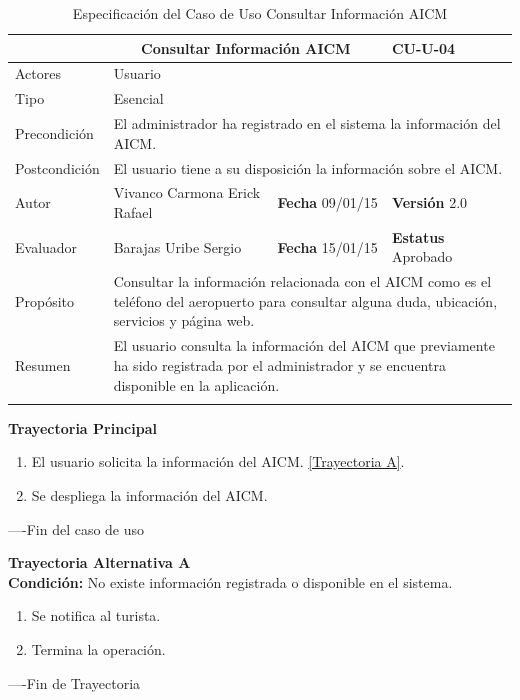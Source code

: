 \begin{longtable}{|p{2.5cm}|p{6.4cm}|p{2cm}|p{2cm}|}
	\hline
		\rowcolor[RGB]{255,102,102}{Caso de Uso}&\multicolumn{2}{c}{Consultar Información AICM}&{\textbf{CU-U-04}}\\
	\hline
		{Actores}&\multicolumn{3}{p{11.2cm}|}{Usuario}\\
	\hline
		{Tipo}&\multicolumn{3}{p{11.2cm}|}{Esencial}\\
	\hline
		{Precondición}&\multicolumn{3}{p{11.2cm}|}{El administrador ha registrado en el sistema la información del AICM.}\\
	\hline
		{Postcondición}&\multicolumn{3}{p{11.2cm}|}{El usuario tiene a su disposición la información sobre el AICM.}\\
	\hline
		{Autor}&{Vivanco Carmona Erick Rafael}&{\textbf{Fecha} 09/01/15}&{\textbf{Versión} 2.0}\\
			\hline
		{Evaluador}&{Barajas Uribe Sergio}&{\textbf{Fecha} 15/01/15}&{\textbf{Estatus} Aprobado}\\
	\hline
		{Propósito}&\multicolumn{3}{p{11.2cm}|}{Consultar la información relacionada con el AICM como es el teléfono del aeropuerto para consultar alguna duda, ubicación, servicios y página web.}\\
	\hline
		{Resumen}&\multicolumn{3}{p{11.2cm}|}{El usuario consulta la información del AICM que previamente ha sido registrada por el administrador y se encuentra disponible en la aplicación.}\\	
	\hline
	\caption[Especificación del Caso de Uso Consultar Información AICM]{Especificación del Caso de Uso Consultar Información AICM}
    	\label{tab:cuConsultarInformacionAICM}
\end{longtable}

\begin{flushleft}
	\textbf{Trayectoria Principal}\\
	\begin{enumerate}
		\item El usuario solicita la información del AICM. \hyperlink{TrayectoriaA_CU-U-04}{[Trayectoria A]}.
		\item Se despliega la información del AICM.
	\end{enumerate}
\end{flushleft}
----Fin del caso de uso

\begin{flushleft}
	\hypertarget{TrayectoriaA_CU-U-04}{}
	\textbf{Trayectoria Alternativa A}\\
	\textbf{Condición:} No existe información registrada o disponible en el sistema. \\
	\begin{enumerate}
		\item  Se notifica al turista. 
		\item Termina la operación.
	\end{enumerate}
\end{flushleft}
----Fin de Trayectoria

